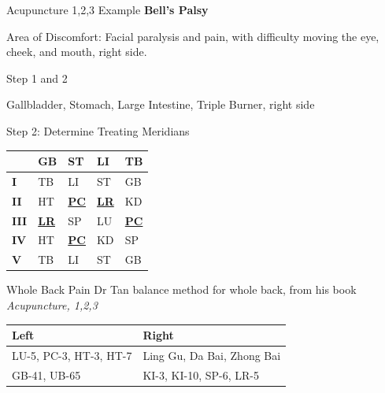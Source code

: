 \begin{frame}{Acupuncture 1,2,3 Example}
  \textbf{\LARGE{Bell's Palsy}}

  Area of Discomfort: Facial paralysis and pain, with difficulty moving the eye, cheek, and mouth, right side.
\end{frame}

\begin{frame}{Step 1 and 2}
  \begin{s1}
    Gallbladder, Stomach, Large Intestine, Triple Burner, right side
  \end{s1}

  Step 2: Determine Treating Meridians

  \begin{table}[]
    \begin{tabular}{@{}lllll@{}}
      \toprule
      & GB                & ST                & LI                & TB                \\ \midrule
      \textbf{I}   & TB                & LI                & ST                & GB                \\
      \textbf{II}  & HT                & {\ul \textbf{PC}} & {\ul \textbf{LR}} & KD                \\
      \textbf{III} & {\ul \textbf{LR}} & SP                & LU                & {\ul \textbf{PC}} \\
      \textbf{IV}  & HT                & {\ul \textbf{PC}} & KD                & SP                \\
      \textbf{V}   & TB                & LI                & ST                & GB                \\ \bottomrule
    \end{tabular}
  \end{table}
\end{frame}

\begin{frame}{Whole Back Pain}
  \Large Dr Tan balance method for whole back, from his book \textit{Acupuncture, 1,2,3}

  \begin{table}[]
    \begin{tabular}{@{}ll@{}}
      \toprule
      Left                   & Right                      \\ \midrule
      LU-5, PC-3, HT-3, HT-7 & Ling Gu, Da Bai, Zhong Bai \\
      GB-41, UB-65           & KI-3, KI-10, SP-6, LR-5    \\ \bottomrule
    \end{tabular}
  \end{table}

\end{frame}

